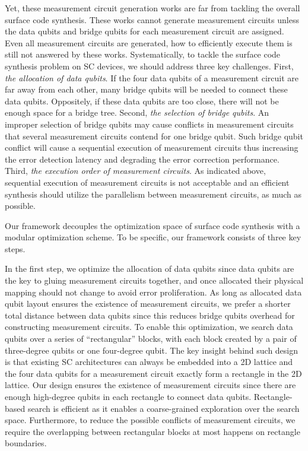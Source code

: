 Yet, these measurement circuit generation works are far from tackling the overall surface code synthesis. 
These works cannot generate measurement circuits unless the data qubits and bridge qubits for each measurement circuit are assigned. Even all measurement circuits are generated, how to efficiently execute them is still not answered by these works. Systematically, to tackle the surface code synthesis problem on SC devices, we should address three key challenges.
First, \textit{the allocation of data qubits}. 
If the four data qubits of a measurement circuit are far away from each other, many bridge qubits will be needed to connect these data qubits. Oppositely, if these data qubits are too close, there will not be enough space for a bridge tree. %
Second, \textit{the selection of bridge qubits}. An improper selection of bridge qubits may cause conflicts in measurement circuits that several measurement circuits contend for one bridge qubit.
Such bridge qubit conflict will cause a sequential execution of measurement circuits thus increasing the error detection latency and degrading the error correction performance.
Third,  \textit{the execution order of measurement circuits}. As indicated above, sequential execution of measurement circuits is not acceptable and
an efficient synthesis should utilize the parallelism between measurement circuits, as much as possible. %






Our framework decouples the optimization space of surface code synthesis with a modular optimization scheme. 
To be specific, our framework consists of three key steps. 

In the first step, we optimize the allocation of data qubits since %
data qubits are the key to gluing  measurement circuits together,
and once allocated their physical mapping should not change to avoid error proliferation. As long as allocated data qubit layout ensures the existence of measurement circuits, we prefer a shorter total distance between data qubits since this reduces bridge qubits overhead for constructing measurement circuits. To enable this optimization, we search data qubits over a series of ``rectangular'' blocks, with each block created by a pair of three-degree qubits or one four-degree qubit.
The key insight behind such design is that existing SC architectures can always be embedded into a 2D lattice and the four data qubits for a measurement circuit exactly form a rectangle in the 2D lattice.
Our design ensures the existence of measurement circuits since there are enough high-degree qubits in each rectangle to connect data qubits. Rectangle-based search is efficient as it enables a coarse-grained exploration over the search space. Furthermore, to reduce the possible conflicts of measurement circuits, we require the overlapping between rectangular blocks at most happens on rectangle boundaries.

